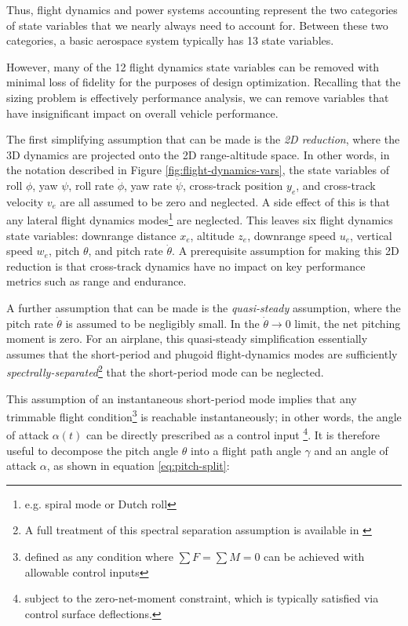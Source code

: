Thus, flight dynamics and power systems accounting represent the two categories of state variables that we nearly always need to account for. Between these two categories, a basic aerospace system typically has 13 state variables.

However, many of the 12 flight dynamics state variables can be removed with minimal loss of fidelity for the purposes of design optimization. Recalling that the sizing problem is effectively performance analysis, we can remove variables that have insignificant impact on overall vehicle performance.

The first simplifying assumption that can be made is the \textit{2D reduction}, where the 3D dynamics are projected onto the 2D range-altitude space. In other words, in the notation described in Figure \ref{fig:flight-dynamics-vars}, the state variables of roll $\phi$, yaw $\psi$, roll rate $\dot\phi$, yaw rate $\dot\psi$, cross-track position $y_e$, and cross-track velocity $v_e$ are all assumed to be zero and neglected. A side effect of this is that any lateral flight dynamics modes\footnote{e.g. spiral mode or Dutch roll} are neglected. This leaves six flight dynamics state variables: downrange distance $x_e$, altitude $z_e$, downrange speed $u_e$, vertical speed $w_e$, pitch $\theta$, and pitch rate $\dot\theta$. A prerequisite assumption for making this 2D reduction is that cross-track dynamics have no impact on key performance metrics such as range and endurance.

A further assumption that can be made is the \textit{quasi-steady} assumption, where the pitch rate $\dot\theta$ is assumed to be negligibly small. In the $\dot\theta\rightarrow 0$ limit, the net pitching moment is zero. For an airplane, this quasi-steady simplification essentially assumes that the short-period and phugoid flight-dynamics modes are sufficiently \textit{spectrally-separated}\footnote{A full treatment of this spectral separation assumption is available in \cite{fva}} that the short-period mode can be neglected.

This assumption of an instantaneous short-period mode implies that any trimmable flight condition\footnote{defined as any condition where $\sum F = \sum M = 0$ can be achieved with allowable control inputs} is reachable instantaneously; in other words, the angle of attack $\alpha(t)$ can be directly prescribed as a control input \footnote{subject to the zero-net-moment constraint, which is typically satisfied via control surface deflections.}. It is therefore useful to decompose the pitch angle $\theta$ into a flight path angle $\gamma$ and an angle of attack $\alpha$, as shown in equation \ref{eq:pitch-split}:

